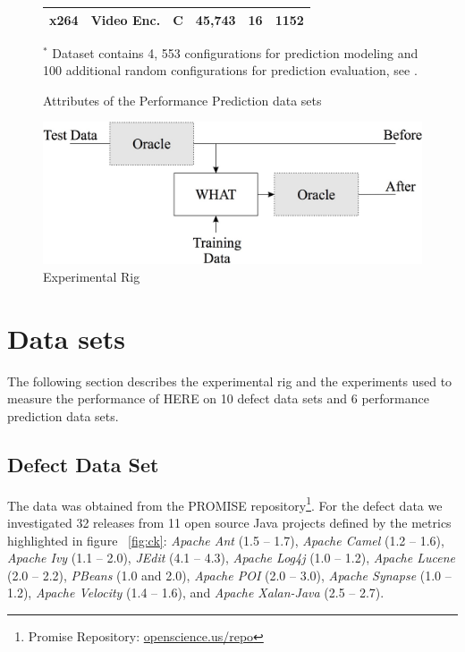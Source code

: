 \documentclass[conference]{IEEEtran}
\newcommand{\kw}[1]{\textit{#1}}
\begin{document}
{\begin{figure}[!hbp]
\begin{center}
{\begin{tabular}{llllll}
x264 & Video Enc. & C& 45,743 & 16 & 1152\\\hline
\end{tabular}}\par\medskip

{ \footnotesize $^*$ Dataset contains 4, 553 configurations for prediction modeling and 100 additional random configurations for prediction evaluation, see \cite{vapp}.}
\end{center}

\caption{Attributes of the Performance Prediction data sets}\label{fig:cpm}
\end{figure}



\begin{figure}[tbp!]
\includegraphics[width=\linewidth]{_figs/WHAT}
\caption{Experimental Rig}
\label{fig:rig}
  
  

\end{figure}

\section{Data sets}

The following section describes the experimental rig and the experiments used to measure the performance of HERE on 10 defect data sets and 6 performance prediction data sets.

\subsection{Defect Data Set}
The data was obtained from the PROMISE repository\footnote{Promise Repository: \url{openscience.us/repo}}. For the defect data we investigated 32 releases from 11 open source Java projects defined by the metrics highlighted in figure ~\ref{fig:ck}: \kw{Apache Ant} (1.5 -- 1.7), \kw{Apache Camel} (1.2 -- 1.6), \kw{Apache Ivy} (1.1 -- 2.0), \kw{JEdit} (4.1 -- 4.3), \kw{Apache Log4j} (1.0 -- 1.2), \kw{Apache Lucene} (2.0 -- 2.2), \kw{PBeans} (1.0 and 2.0), \kw{Apache POI} (2.0 -- 3.0), \kw{Apache Synapse} (1.0 -- 1.2), \kw{Apache Velocity} (1.4 -- 1.6), and \kw{Apache Xalan-Java} (2.5 -- 2.7). 

}
\end{document}
